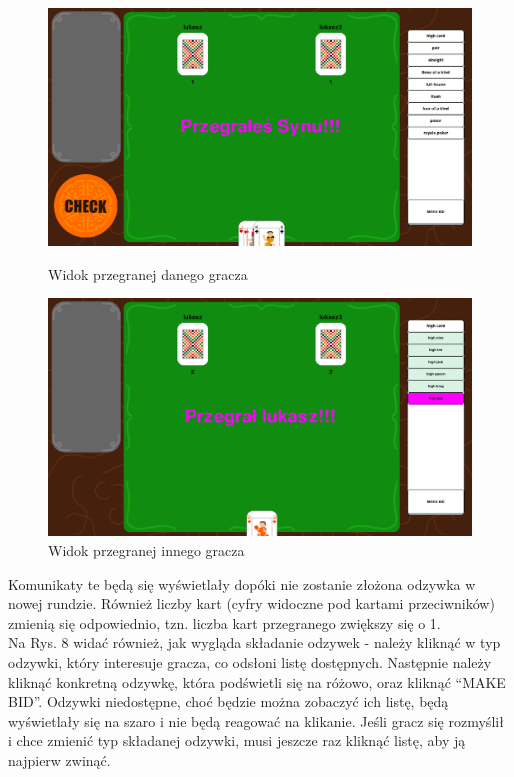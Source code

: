 \documentclass{article}
\begin{document}
\begin{figure}[!htb]
   	\begin{minipage}{0.48\textwidth}
    	\centering
     	\includegraphics[width=\linewidth]{przegralessynu}
     	\caption{Widok przegranej danego gracza}
   	\end{minipage}\hfill
   	\begin{minipage}{0.48\textwidth}
     	\centering
     	\includegraphics[width=\linewidth]{ktosprzegral}
     	\caption{Widok przegranej innego gracza}
   	\end{minipage}
\end{figure}

Komunikaty te będą się wyświetlały dopóki nie zostanie złożona odzywka w nowej rundzie. Również liczby kart (cyfry widoczne pod kartami przeciwników) zmienią się odpowiednio, tzn. liczba kart przegranego zwiększy się o 1.\\
Na Rys. 8 widać również, jak wygląda składanie odzywek - należy kliknąć w typ odzywki, który interesuje gracza, co odsłoni listę dostępnych. Następnie należy kliknąć konkretną odzywkę, która podświetli się na różowo, oraz kliknąć ``MAKE BID''. Odzywki niedostępne, choć będzie można zobaczyć ich listę, będą wyświetlały się na szaro i nie będą reagować na klikanie. Jeśli gracz się rozmyślił i chce zmienić typ składanej odzywki, musi jeszcze raz kliknąć listę, aby ją najpierw zwinąć.
\end{document}
